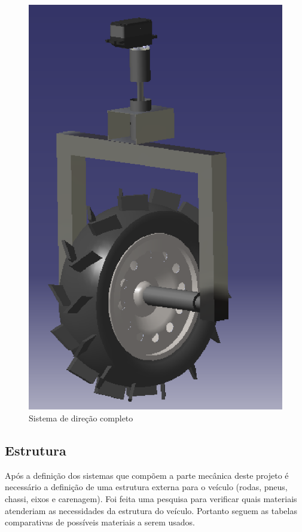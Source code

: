           \begin{figure}[!htbp]
          	\begin{center}
          		\includegraphics[keepaspectratio=true,scale=1]{figuras/d2.eps}
          		\caption{Sistema de direção completo}
          	\end{center}
          \end{figure}
      
  \subsection{Estrutura}
  Após a definição dos sistemas que compõem a parte mecânica deste projeto é necessário a definição de uma estrutura externa para o veículo (rodas, pneus, chassi, eixos e carenagem). Foi feita uma pesquisa para verificar quais materiais atenderiam as necessidades da estrutura do veículo. Portanto seguem as tabelas comparativas de possíveis materiais a serem usados.

